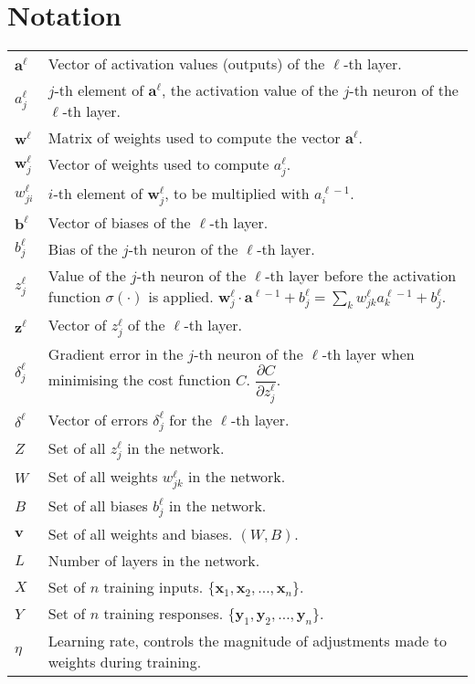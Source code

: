 \section*{Notation}

\begin{tabular}{p{1cm}p{13cm}}
$\mathbf{a}^\ell$ & Vector of activation values (outputs) of the $\ell$-th layer.\\
$a_j^\ell$ & $j$-th element of $\mathbf{a}^\ell$, the activation value of the $j$-th neuron of the $\ell$-th layer.\\
$\mathbf{w}^\ell$ & Matrix of weights used to compute the vector $\mathbf{a}^\ell$.\\
$\mathbf{w}^\ell_j$ & Vector of weights used to compute $a_j^\ell$.\\
$w_{ji}^\ell$ & $i$-th element of $\mathbf{w}^\ell_j$, to be multiplied with $a_i^{\ell-1}$.\\
$\mathbf{b}^\ell$ & Vector of biases of the $\ell$-th layer.\\
$b_j^\ell$ & Bias of the $j$-th neuron of the $\ell$-th layer.\\
$z_j^\ell$ & Value of the $j$-th neuron of the $\ell$-th layer before the activation function $\sigma(\cdot)$ is applied. $\mathbf{w}_j^\ell\cdot \mathbf{a}^{\ell-1} + b_j^\ell= \sum_k w_{jk}^\ell a_k^{\ell-1} + b_j^\ell$.\\
$\mathbf{z}^\ell$ & Vector of $z_j^\ell$ of the $\ell$-th layer.\\
$\delta_j^\ell$ & Gradient error in the $j$-th neuron of the $\ell$-th layer when minimising the cost function $C$. $\dfrac{\partial C}{\partial z_j^\ell}$.\\
$\delta^\ell$ & Vector of errors $\delta_j^\ell$ for the $\ell$-th layer.\\
$Z$ & Set of all $z_j^\ell$ in the network. \\
$W$ & Set of all weights $w_{jk}^\ell$ in the network.\\
$B$ & Set of all biases $b_j^\ell$ in the network. \\
$\mathbf{v}$ & Set of all weights and biases. $(W,B)$.\\
$L$ & Number of layers in the network.\\
$X$ & Set of $n$ training inputs. $\{\mathbf{x}_1, \mathbf{x}_2, \ldots, \mathbf{x}_n\}$. \\
$Y$ & Set of $n$ training responses. $\{\mathbf{y}_1, \mathbf{y}_2, \ldots, \mathbf{y}_n\}$.\\
$\eta$ & Learning rate, controls the magnitude of adjustments made to weights during training.
\end{tabular}